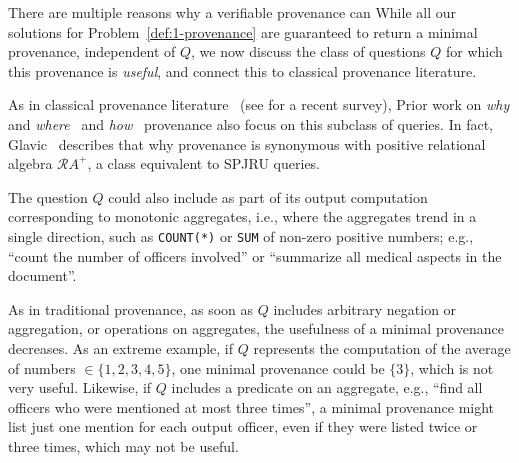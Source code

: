 

\if 
There are multiple  reasons why a verifiable provenance can 
While all our solutions for Problem~\ref{def:1-provenance}
are guaranteed to return a minimal provenance,
independent of $Q$,
we now discuss the class of questions $Q$ for which
this provenance is {\em useful},
and connect this to classical provenance literature.

As in classical provenance literature~\cite{green2007provenance,buneman2001and,cheney2009provenance} (see \cite{glavic2021data} for a recent survey),  
Prior work on {\em why} and {\em where}~\cite{buneman2001and} and {\em how}~\cite{green2007provenance} provenance
also focus on this subclass of queries. 
In fact, Glavic~\cite{glavic2021data} describes
that why provenance is synonymous with 
positive relational algebra ${\mathcal RA}^+$,
a class equivalent to SPJRU queries.
 
The question $Q$ could also include as part of its output computation
corresponding to monotonic aggregates, i.e., where
the aggregates trend in a single direction, such as 
\texttt{COUNT(*)} 
or \texttt{SUM} of non-zero positive numbers; e.g., ``count the number of officers involved''
or ``summarize all medical aspects in the document''. 


As in traditional provenance, as soon as $Q$ includes
arbitrary negation or aggregation, or operations on aggregates, 
the usefulness
of a minimal provenance decreases. 
As an extreme example, if $Q$ represents the computation of 
the average of numbers $ \in  \{1, 2, 3, 4, 5\}$,
one minimal provenance could be $\{3\}$, which is not
very useful. 
Likewise, if $Q$ includes a predicate on an aggregate, e.g., ``find
all officers who were mentioned at most three times'',
a minimal provenance might list 
just one mention for each output officer, 
even if they were listed twice or three times, which may not be useful.

